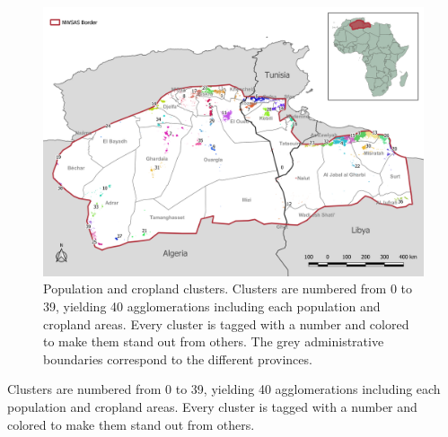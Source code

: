\documentclass[12pt]{iopart}
\begin{document}
\begin{figure}[!h]
	\centering
	\includegraphics[width=\textwidth, cfbox=black 1pt 0pt]{NWSAS_clusters}
	\caption{Population and cropland clusters. Clusters are numbered from 0 to 39, yielding 40 agglomerations including each population and cropland areas. Every cluster is tagged with a number and colored to make them stand out from others. The grey administrative boundaries correspond to the different provinces.}
	\label{fig:clusters}
\end{figure} 

Clusters are numbered from 0 to 39, yielding 40 agglomerations including each population and cropland areas. Every cluster is tagged with a number and colored to make them stand out from others.


\clearpage
\end{document}
